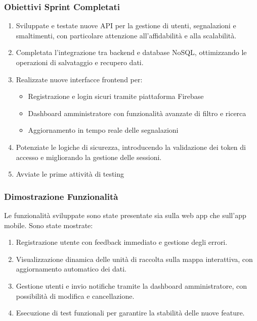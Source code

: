 \subsubsection{Obiettivi Sprint Completati}

\begin{enumerate}
    \item Sviluppate e testate nuove API per la gestione di utenti, segnalazioni e smaltimenti, con particolare attenzione all'affidabilità e alla scalabilità.
    
    \item Completata l'integrazione tra backend e database NoSQL, ottimizzando le operazioni di salvataggio e recupero dati.
    
    \item Realizzate nuove interfacce frontend per:
    \begin{itemize}
        \item Registrazione e login sicuri tramite piattaforma Firebase
        \item Dashboard amministratore con funzionalità avanzate di filtro e ricerca
        \item Aggiornamento in tempo reale delle segnalazioni
    \end{itemize}
    
    \item Potenziate le logiche di sicurezza, introducendo la validazione dei token di accesso e migliorando la gestione delle sessioni.
    
    \item Avviate le prime attività di testing 
    \end{enumerate}

    \subsubsection{Dimostrazione Funzionalità}
    Le funzionalità sviluppate sono state presentate sia sulla web app che sull’app mobile. Sono state mostrate:
    \begin{enumerate}
    \item Registrazione utente con feedback immediato e gestione degli errori.
    
    \item Visualizzazione dinamica delle unità di raccolta sulla mappa interattiva, con aggiornamento automatico dei dati.
    
    \item Gestione utenti e invio notifiche tramite la dashboard amministratore, con possibilità di modifica e cancellazione.
    
    \item Esecuzione di test funzionali per garantire la stabilità delle nuove feature.
    
\end{enumerate}

